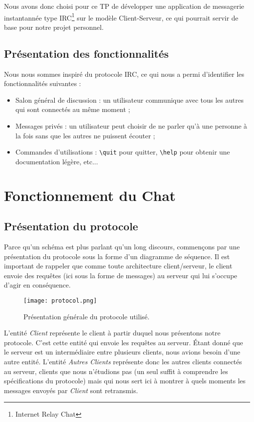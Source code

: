 		Nous avons donc choisi pour ce TP de développer une application de messagerie instantannée type IRC\footnote{Internet Relay Chat} sur le modèle Client-Serveur, ce qui pourrait servir de base pour notre projet personnel.
		

	\section{Présentation des fonctionnalités}
		Nous nous sommes inspiré du protocole IRC, ce qui nous a permi d'identifier les fonctionnalités suivantes :
		\begin{itemize}
			\item Salon général de discussion : un utilisateur communique avec tous les autres qui sont connectés au même moment ;
			\item Messages privés : un utilisateur peut choisir de ne parler qu'à une personne à la fois sans que les autres ne puissent écouter ;
			\item Commandes d'utilisations : \verb!\quit! pour quitter, \verb!\help! pour obtenir une documentation légère, etc...
		\end{itemize}
		

\chapter{Fonctionnement du Chat}
	
	\section{Présentation du protocole}
		Parce qu'un schéma est plus parlant qu'un long discours, commençons par une présentation du protocole sous la forme d'un diagramme de séquence. Il est important de rappeler que comme toute architecture client/serveur, le client envoie des requêtes (ici sous la forme de messages) au serveur qui lui s'occupe d'agir en conséquence.
		\begin{figure}[h!]
			\centering
			\texttt{[image: protocol.png]}
			\caption{Présentation générale du protocole utilisé.}
		\end{figure}
		\FloatBarrier
		
		L'entité \emph{Client} représente le client à partir duquel nous présentons notre protocole. C'est cette entité qui envoie les requêtes au serveur. Étant donné que le serveur est un intermédiaire entre plusieurs clients, nous avions besoin d'une autre entité. L'entité \emph{Autres Clients} représente donc les autres clients connectés au serveur, clients que nous n'étudions pas (un seul suffit à comprendre les spécifications du protocole) mais qui nous sert ici à montrer à quels moments les messages envoyés par \emph{Client} sont retransmis.\\
		
